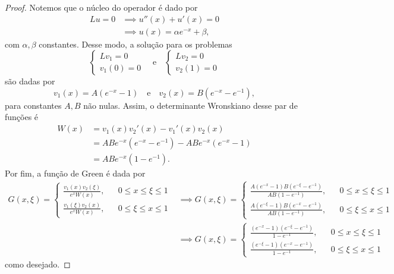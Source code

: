 \begin{proof}
    Notemos que o núcleo do operador é dado por
    \begin{align}
        Lu = 0 &\implies u''(x) + u'(x) = 0\\
               &\implies u(x) = \alpha e^{-x} + \beta,
    \end{align}
    com \(\alpha, \beta\) constantes. Desse modo, a solução para os problemas
    \begin{equation*}
        \begin{cases}
            Lv_1 = 0\\
            v_1(0) = 0
        \end{cases}
        \quad\text{e}\quad
        \begin{cases}
            Lv_2 = 0\\
            v_2(1) = 0
        \end{cases}
    \end{equation*}
    são dadas por
    \begin{equation*}
        v_1(x) = A(e^{-x} - 1)\quad\text{e}\quad v_2(x) = B(e^{-x} - e^{-1}),
    \end{equation*}
    para constantes \(A, B\) não nulas. Assim, o determinante Wronskiano desse par de funções é
    \begin{align*}
        W(x) &= v_1(x) v_2'(x) - v_1'(x) v_2(x)\\
             &= AB e^{-x}(e^{-x} - e^{-1}) -AB e^{-x} (e^{-x} - 1)\\
             &= AB e^{-x} (1 - e^{-1}).
    \end{align*}
    Por fim, a função de Green é dada por
    \begin{align*}
        G(x,\xi) = \left\{\begin{aligned}
                \frac{v_1(x)v_2(\xi)}{e^{x}W(x)}, && 0 \leq x \leq \xi \leq 1\\
                \frac{v_1(\xi)v_2(x)}{e^{x}W(x)}, && 0 \leq \xi \leq x \leq 1
        \end{aligned}\right. &\implies G(x,\xi) = \left\{\begin{aligned}
                \frac{A(e^{-x} - 1)B(e^{-\xi} - e^{-1})}{AB(1 - e^{-1})}, && 0 \leq x \leq \xi \leq 1\\
                \frac{A(e^{-\xi} -1)B(e^{-x} - e^{-1})}{AB(1 - e^{-1})}, && 0 \leq \xi \leq x \leq 1
        \end{aligned}\right.
\\
        &\implies G(x,\xi) = \left\{\begin{aligned}
                \frac{(e^{-x} - 1)(e^{-\xi} - e^{-1})}{1 - e^{-1}}, && 0 \leq x \leq \xi \leq 1\\
                \frac{(e^{-\xi} - 1)(e^{-x} - e^{-1})}{1 - e^{-1}}, && 0 \leq \xi \leq x \leq 1
        \end{aligned}\right.
    \end{align*}
    como desejado.
\end{proof}

